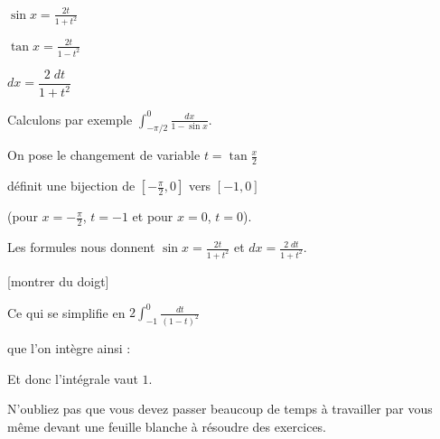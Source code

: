 \change

$\sin x = \frac{2t}{1+t^2}$

\change

$\tan x = \frac{2t}{1-t^2}$

\change

$dx=\dfrac{2\;dt}{1+t^2}$

\change

\change

Calculons par exemple $\int_{-\pi/2}^0 \frac{dx}{1-\sin x}$.

\change

On pose le changement de variable $t=\tan \frac{x}{2}$ 

\change

définit une bijection de $[-\frac\pi2,0]$ vers $[-1,0]$ 

(pour $x=-\frac\pi2$, $t=-1$ et pour $x=0$, $t=0$). 

\change

Les formules nous donnent $\sin x = \frac{2t}{1+t^2}$
et $dx=\frac{2\;dt}{1+t^2}$.

[montrer du doigt]

\change

\change

\change

Ce qui se simplifie en $2\int_{-1}^0 \frac{dt}{(1-t)^2} $

\change

que l'on intègre ainsi :

\change

\change

Et donc l'intégrale vaut $1$.


\diapo

N'oubliez pas que vous devez passer beaucoup 
de temps à travailler par vous même devant une feuille blanche
à résoudre des exercices.



